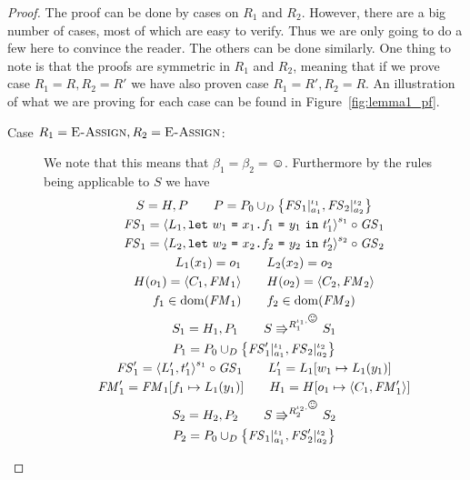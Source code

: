 \begin{proof}
  The proof can be done by cases on $R_1$ and $R_2$. However, there are a big number
  of cases, most of which are easy to verify. Thus we are only going to do a few
  here to convince the reader. The others can be done similarly. One thing to
  note is that the proofs are symmetric in $R_1$ and $R_2$, meaning that if we
  prove case $R_1 = R, R_2 = R'$ we have also proven case $R_1 = R', R_2 = R$.
  An illustration of what we are proving for each case can be found in
  Figure~\ref{fig:lemma1_pf}.

  \begin{description}
    \item[Case $R_1 = \mbox{{\sc E-Assign}}, R_2 = \mbox{{\sc E-Assign}}$:] We note that this means that
      $\beta_1 = \beta_2 = \smiley$. Furthermore by the rules being applicable
      to $S$ we have
      \begin{equation}
        \begin{gathered}
          S = H, P \andalso P = P_0 \cup_D \left\{ \FS_1|_{a_1}^{\iota_1},
          \FS_2|_{a_2}^{\iota_2} \right\} \\
          \FS_1 = \xframe{L_1, \Let{w_1}{\FAss{x_1}{f_1}{y_1}}{t'_1}}^{s_1} \circ \GS_1
          \\ 
          \FS_1 = \xframe{L_2, \Let{w_2}{\FAss{x_2}{f_2}{y_2}}{t'_2}}^{s_2}
          \circ \GS_2 \\
          L_1(x_1) = o_1 \andalso L_2(x_2) = o_2 \\
          H(o_1) = \Obj{C_1, \FM_1} \andalso H(o_2) = \Obj{C_2, \FM_2} \\
          f_1 \in \dom(\FM_1) \andalso f_2 \in \dom(\FM_2) \\
          S_1 = H_1, P_1 \andalso S \Rrightarrow^{R_1^{\iota_1, \smiley}} S_1
          \\
          P_1 = P_0 \cup_D \left\{ \FS'_1|_{a_1}^{\iota_1},
          \FS_2|_{a_2}^{\iota_2} \right\} \\
          \FS'_1 = \xframe{L'_1, t'_1}^{s_1} \circ \GS_1  \andalso L'_1 = L_1[w_1 \mapsto
          L_1(y_1)] \\
          \FM'_1 = \FM_1[f_1 \mapsto L_1(y_1)] \andalso H_1 = H[o_1 \mapsto
          \Obj{C_1, \FM'_1}]
          \\
          S_2 = H_2, P_2 \andalso S \Rrightarrow^{R_2^{\iota_2, \smiley}} S_2
          \\
          P_2 = P_0 \cup_D \left\{ \FS_1|_{a_1}^{\iota_1},
          \FS'_2|_{a_2}^{\iota_2} \right\} \\

\end{gathered}
\end{equation}
\end{description}
\end{proof}
